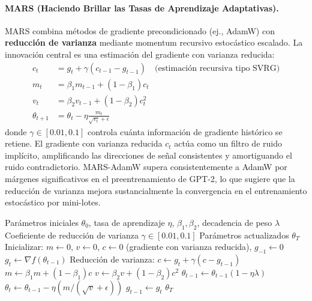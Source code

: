 \paragraph{MARS (Haciendo Brillar las Tasas de Aprendizaje Adaptativas).}
MARS combina métodos de gradiente precondicionado (ej., AdamW) con \textbf{reducción de varianza} mediante momentum recursivo estocástico escalado. La innovación central es una estimación del gradiente con varianza reducida:
\begin{align}
c_t &= g_t + \gamma(c_{t-1} - g_{t-1}) \quad\text{(estimación recursiva tipo SVRG)} \\
m_t &= \beta_1 m_{t-1} + (1-\beta_1)c_t \\
v_t &= \beta_2 v_{t-1} + (1-\beta_2)c_t^2 \\
\theta_{t+1} &= \theta_t - \eta\frac{m_t}{\sqrt{v_t}+\epsilon}
\end{align}
donde $\gamma \in [0.01, 0.1]$ controla cuánta información de gradiente histórico se retiene. El gradiente con varianza reducida $c_t$ actúa como un filtro de ruido implícito, amplificando las direcciones de señal consistentes y amortiguando el ruido contradictorio. MARS-AdamW supera consistentemente a AdamW por márgenes significativos en el preentrenamiento de GPT-2, lo que sugiere que la reducción de varianza mejora sustancialmente la convergencia en el entrenamiento estocástico por mini-lotes.

\begin{algorithm}[H]
\caption{MARS (Haciendo Brillar las Tasas de Aprendizaje Adaptativas)}
\label{alg:mars}
\begin{algorithmic}[1]
\Require Parámetros iniciales $\theta_0$, tasa de aprendizaje $\eta$, $\beta_1, \beta_2$, decadencia de peso $\lambda$
\Require Coeficiente de reducción de varianza $\gamma \in [0.01, 0.1]$
\Ensure Parámetros actualizados $\theta_T$
\State Inicializar: $m \gets 0$, $v \gets 0$, $c \gets 0$ (gradiente con varianza reducida), $g_{-1} \gets 0$
    \State $g_t \gets \nabla f(\theta_{t-1})$
    \State Reducción de varianza: $c \gets g_t + \gamma(c - g_{t-1})$
    \State $m \gets \beta_1 m + (1-\beta_1) c$
    \State $v \gets \beta_2 v + (1-\beta_2) c^2$
        \State $\theta_{t-1} \gets \theta_{t-1}(1 - \eta\lambda)$
    \EndIf
    \State $\theta_t \gets \theta_{t-1} - \eta (m / (\sqrt{v} + \epsilon))$
    \State $g_{t-1} \gets g_t$
\EndFor
\Return $\theta_T$
\end{algorithmic}
\end{algorithm}

